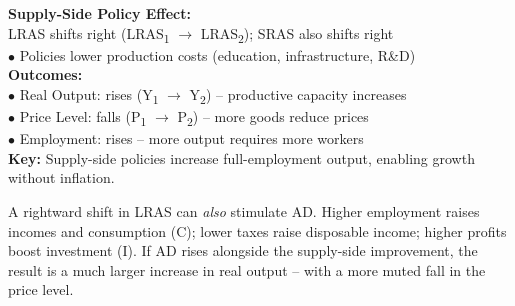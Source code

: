 \documentclass[11pt, a4paper, twoside]{book}
\begin{document}
\begin{diagrambox}
{%
}{%
\textbf{\color{NavyPrimary}Supply-Side Policy Effect:}\\[4pt]
LRAS shifts right (LRAS\textsubscript{1} $\to$ LRAS\textsubscript{2}); SRAS also shifts right\\[2pt]
$\bullet$ Policies lower production costs (education, infrastructure, R\&D)\\[4pt]
\textbf{\color{NavyPrimary}Outcomes:}\\[2pt]
$\bullet$ Real Output: rises (Y\textsubscript{1} $\to$ Y\textsubscript{2}) -- productive capacity increases\\[2pt]
$\bullet$ Price Level: falls (P\textsubscript{1} $\to$ P\textsubscript{2}) -- more goods reduce prices\\[2pt]
$\bullet$ Employment: rises -- more output requires more workers\\[4pt]
\textbf{\color{GoldAccent}Key:} Supply-side policies increase full-employment output, enabling growth without inflation.%
}
\end{diagrambox}

\begin{coreidea}
A rightward shift in LRAS can \emph{also} stimulate AD. Higher employment raises incomes and consumption (C); lower taxes raise disposable income; higher profits boost investment (I). If AD rises alongside the supply-side improvement, the result is a much larger increase in real output -- with a more muted fall in the price level.
\end{coreidea}
\end{document}
